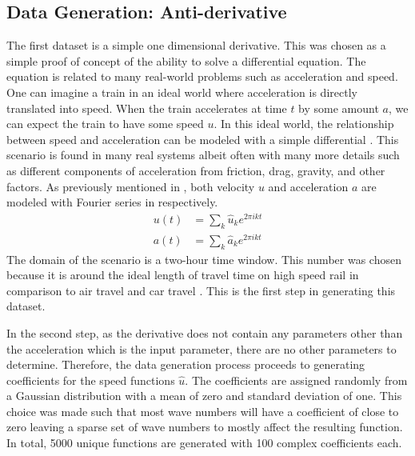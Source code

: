 \subsection{Data Generation: Anti-derivative}
\noindent The first dataset is a simple one dimensional derivative. This was chosen as a simple proof of concept of the ability to solve a differential equation. The equation is related to many real-world problems such as acceleration and speed. One can imagine a train in an ideal world where acceleration is directly translated into speed. When the train accelerates at time \(t \) by some amount \(a \), we can expect the train to have some speed \(u \). In this ideal world, the relationship between speed and acceleration can be modeled with a simple differential . This scenario is found in many real systems albeit often with many more details such as different components of acceleration from friction, drag, gravity, and other factors.
As previously mentioned in , both velocity \(u \) and acceleration \(a \) are modeled with Fourier series in  respectively.
\begin{align}
  u\left( t \right)         & = \sum_{k} \hat{u}_k e^{2\pi ikt} \label{eq:fourier_speed}        \\
  a\left( t \right)         & = \sum_{k} \hat{a}_k e^{2\pi ikt} \label{eq:fourier_acceleration}
\end{align}
The domain of the scenario is a two-hour time window. This number was chosen because it is around the ideal length of travel time on high speed rail in comparison to air travel and car travel \autocite{givoniDevelopmentImpactModern2006,wangEfficiencySpatialEquity2019,wrro2236}. This is the first step in generating this dataset.

In the second step, as the derivative  does not contain any parameters other than the acceleration which is the input parameter, there are no other parameters to determine. Therefore, the data generation process proceeds to generating coefficients for the speed functions \(\hat{u} \). The coefficients are assigned randomly from a Gaussian distribution with a mean of zero and standard deviation of one. This choice was made such that most wave numbers will have a coefficient of close to zero leaving a sparse set of wave numbers to mostly affect the resulting function. In total, \num{5000} unique functions are generated with \num{100} complex coefficients each.

